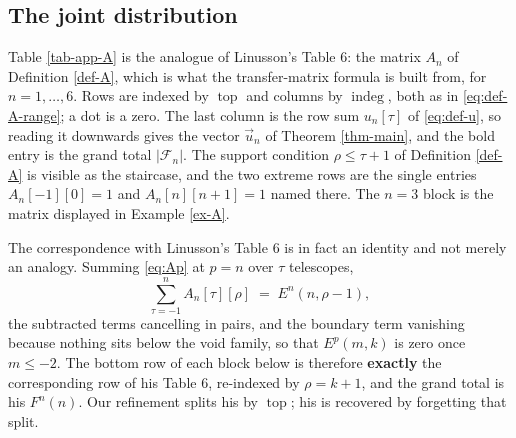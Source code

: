 \documentclass[11pt, a4paper, abstract=yes]{scrartcl}
\theoremstyle{definition}
\theoremstyle{remark}
\theoremstyle{plain}
\newcommand{\indeg}{\operatorname{indeg}}
\newcommand{\tp}{\operatorname{top}}
\begin{document}
\subsection{The joint distribution}
\label{sec:org7f72551}

Table \ref{tab-app-A} is the analogue of Linusson's Table 6: the matrix \(A_n\) of
Definition \ref{def-A}, which is what the transfer-matrix formula is built from, for
\(n=1,\dots,6\). Rows are indexed by \(\tp\) and columns by \(\indeg\), both as in
\eqref{eq:def-A-range}; a dot is a zero. The last column is the row sum \(u_n[\tau]\) of
\eqref{eq:def-u}, so reading it downwards gives the vector \(\vec u_n\) of Theorem \ref{thm-main},
and the bold entry is the grand total \(\lvert\mathcal F_n\rvert\). The support condition
\(\rho\le\tau+1\) of Definition \ref{def-A} is visible as the staircase, and the two extreme rows
are the single entries \(A_n[-1][0]=1\) and \(A_n[n][n+1]=1\) named there. The \(n=3\) block is the
matrix displayed in Example \ref{ex-A}.

The correspondence with Linusson's Table 6 is in fact an identity and not merely an analogy.
Summing \eqref{eq:Ap} at \(p=n\) over \(\tau\) telescopes,
\begin{equation}\label{eq:colsum-is-E}
  \sum_{\tau=-1}^{n}A_n[\tau][\rho]\;=\;E^n(n,\rho-1) ,
\end{equation}
the subtracted terms cancelling in pairs, and the boundary term vanishing because nothing sits
below the void family, so that \(E^p(m,k)\) is zero once \(m\le-2\). The bottom row of each block
below is therefore \textbf{exactly} the corresponding row of his Table 6,
re-indexed by \(\rho=k+1\), and the grand total is his \(F^n(n)\). Our refinement splits his by
\(\tp\); his is recovered by forgetting that split.
\end{document}
